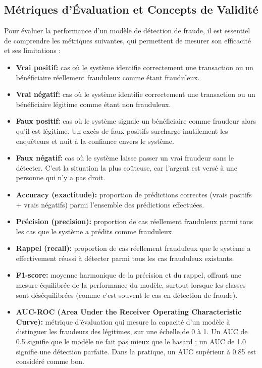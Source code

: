 \documentclass[a4paper, oneside, 12pt]{book}
\begin{document}
\subsection{Métriques d'Évaluation et Concepts de Validité}

\hspace{0.5cm}Pour évaluer la performance d'un modèle de détection de fraude, 
il est essentiel de comprendre les métriques suivantes, qui permettent de mesurer 
son efficacité et ses limitations :

\begin{itemize}[label=\textbullet]

    \item \textbf{Vrai positif:} cas où le système identifie correctement une 
    transaction ou un bénéficiaire réellement frauduleux comme étant frauduleux.

    \item \textbf{Vrai négatif:} cas où le système identifie correctement une 
    transaction ou un bénéficiaire légitime comme étant non frauduleux.

    \item \textbf{Faux positif:} cas où le système signale un bénéficiaire comme 
    fraudeur alors qu'il est légitime. Un excès de faux positifs surcharge 
    inutilement les enquêteurs et nuit à la confiance envers le système.

    \item \textbf{Faux négatif:} cas où le système laisse passer un vrai fraudeur 
    sans le détecter. C'est la situation la plus coûteuse, car l'argent est versé 
    à une personne qui n'y a pas droit.

    \item \textbf{Accuracy (exactitude):} proportion de prédictions correctes 
    (vrais positifs + vrais négatifs) parmi l'ensemble des prédictions effectuées.
    
    \item \textbf{Précision (precision):} proportion de cas réellement frauduleux 
    parmi tous les cas que le système a prédits comme frauduleux.
    
    \item \textbf{Rappel (recall):} proportion de cas réellement frauduleux que le 
    système a effectivement réussi à détecter parmi tous les cas frauduleux 
    existants.
    
    \item \textbf{F1-score:} moyenne harmonique de la précision et du rappel, 
    offrant une mesure équilibrée de la performance du modèle, surtout lorsque les 
    classes sont déséquilibrées (comme c'est souvent le cas en détection de fraude).

    \item \textbf{AUC-ROC (Area Under the Receiver Operating Characteristic Curve):} 
    métrique d'évaluation qui mesure la capacité d'un modèle à distinguer les 
    fraudeurs des légitimes, sur une échelle de 0 à 1. Un AUC de 0.5 signifie que 
    le modèle ne fait pas mieux que le hasard ; un AUC de 1.0 signifie une 
    détection parfaite. Dans la pratique, un AUC supérieur à 0.85 est considéré 
    comme bon.

\end{itemize}
\end{document}
